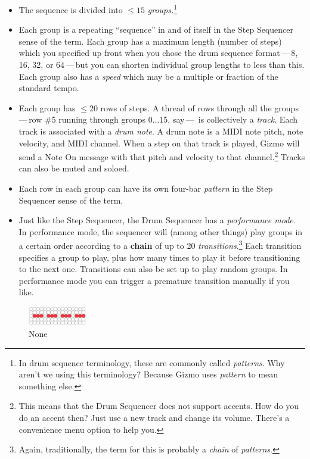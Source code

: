 \documentclass{article}
\begin{document}
\begin{itemize} 
\item The sequence is divided into \(\leq 15\) {\it groups.}\footnote{In drum sequence terminology, these are commonly called {\it patterns}.  Why aren't we using this terminology?  Because Gizmo uses {\it pattern} to mean something else.}
\item Each group is a repeating ``sequence'' in and of itself in the Step Sequencer sense of the term.  Each group has a maximum length (number of steps) which you specified up front when you chose the drum sequence format\,---\,8, 16, 32, or 64\,---\,but you can shorten individual group lengths to less than this.  Each group also has a {\it speed} which may be a multiple or fraction of the standard tempo.
\item Each group has \(\leq 20\) rows of steps.  A thread of rows through all the groups\,---\,row \#5 running through groups 0...15, say\,---\, is collectively a {\it track}.  Each track is associated with a {\it drum note}.  A drum note is a MIDI note pitch, note velocity, and MIDI channel.  When a step on that track is played, Gizmo will send a Note On message with that pitch and velocity to that channel.\footnote{This means that the Drum Sequencer does not support accents.  How do you do an accent then?  Just use a new track and change its volume.  There's a convenience menu option to help you.} Tracks can also be muted and soloed.
\item Each row in each group can have its own four-bar {\it pattern} in the Step Sequencer sense of the term.
\item Just like the Step Sequencer, the Drum Sequencer has a {\it performance mode}.  In performance mode, the sequencer will (among other things) play groups in a certain order according to a {\bf chain} of up to 20 {\it transitions}.\footnote{Again, traditionally, the term for this is probably a {\it chain} of {\it patterns}.}  Each transition specifies a group to play, plus how many times to play it before transitioning to the next one.  Transitions can also be set up to play random groups.  In performance mode you can trigger a premature transition manually if you like.
\end{itemize}

\begin{figure}
\includegraphics[width=1in]{none.pdf}
\vspace{-2em}\caption{\small None}\vspace{-1em}
\end{figure}
\end{document}
